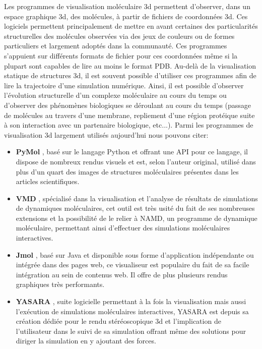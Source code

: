 Les programmes de visualisation moléculaire 3d permettent d'observer, dans un espace graphique 3d, des molécules, à partir de fichiers de coordonnées 3d. Ces logiciels permettent principalement de mettre en avant certaines des particularités structurelles des molécules observées via des jeux de couleurs ou de formes particuliers et largement adoptés dans la communauté. Ces programmes s'appuient sur différents formats de fichier pour ces coordonnées même si la plupart sont capables de lire au moins le format PDB. Au-delà de la visualisation statique de structures 3d, il est souvent possible d'utiliser ces programmes afin de lire la trajectoire d'une simulation numérique. Ainsi, il est possible d'observer l'évolution structurelle d'un complexe moléculaire au cours du temps ou d'observer des phénomènes biologiques se déroulant au cours du temps (passage de molécules au travers d'une membrane, repliement d'une région protéique suite à son interaction avec un partenaire biologique, etc...). Parmi les programmes de visualisation 3d largement utilisés aujourd'hui nous pouvons citer: 
\begin{itemize}
	\item \textbf{PyMol} \cite{delano_pymol_2002}, basé sur le langage Python et offrant une API pour ce langage, il dispose de nombreux rendus visuels et est, selon l'auteur original, utilisé dans plus d'un quart des images de structures moléculaires présentes dans les articles scientifiques.
	\item \textbf{VMD} \cite{humphrey_vmd:_1996}, spécialisé dans la visualisation et l'analyse de résultats de simulations de dynamiques moléculaires, cet outil est très usité du fait de ses nombreuses extensions et la possibilité de le relier à NAMD, un programme de dynamique moléculaire, permettant ainsi d'effectuer des simulations moléculaires interactives.
	\item \textbf{Jmol} \cite{herraez2006biomolecules}, basé sur Java et disponible sous forme d'application indépendante ou intégrée dans des pages web, ce visualiseur est populaire du fait de sa facile intégration au sein de contenus web. Il offre de plus plusieurs rendus graphiques très performants.
	\item \textbf{YASARA} \cite{krieger2014yasara}, suite logicielle permettant à la fois la visualisation mais aussi l’exécution de simulations moléculaires interactives, YASARA est depuis sa création dédiée pour le rendu stéréoscopique 3d et l'implication de l'utilisateur dans le suivi de sa simulation offrant même des solutions pour diriger la simulation en y ajoutant des forces.
\end{itemize}

